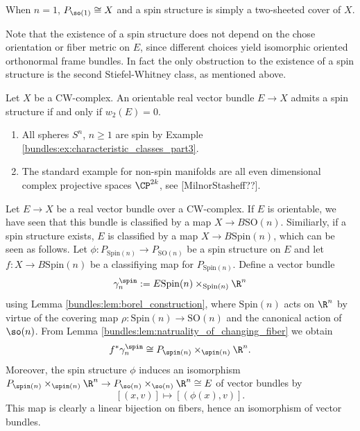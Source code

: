 \begin{remark}
    When $n=1$, $P_{\so(1)} \cong X$ and a spin structure is simply a two-sheeted cover of $X$.
\end{remark}
Note that the existence of a spin structure does not depend on the chose orientation or fiber metric on $E$, since different choices yield isomorphic oriented orthonormal frame bundles. In fact the only obstruction to the existence of a spin structure is the second Stiefel-Whitney class, as mentioned above.

\begin{theorem}[Lawson,Micheaslon] %
    \label{bundles:thm:spin_iff_w2_vanishes}
    Let $X$ be a CW-complex. An orientable real vector bundle $E \to X$ admits a spin structure if and only if $w_2(E) = 0$. 
\end{theorem}

\begin{example}
    \begin{enumerate}[label=(\roman*)]
        \item All spheres $S^n$, $n\geq 1$ are spin by Example \label{bundles:ex:characteristic_classes} \ref{bundles:ex:characteristic_classes_part3}.
        \item \label{bundles:ex:cp2_not_spin} The standard example for non-spin manifolds are all even dimensional complex projective spaces $\CP^{2k}$, see [MilnorStasheff??].
    \end{enumerate}
\end{example}

\begin{remark}
    \label{bundles:rem:classifying_map_for_spin_bundles}
    Let $E \to X$ be a real vector bundle over a CW-complex. If $E$ is orientable, we have seen that this bundle is classified by a map $X \to B\mathrm{SO}(n)$. Similiarly, if a spin structure exists, $E$ is classified by a map $X \to B\mathrm{Spin}(n)$, which can be seen as follows. Let $\phi \colon P_{\mathrm{Spin}(n)} \to P_{\mathrm{SO}(n)}$ be a spin structure on $E$ and let $f \colon X \to B\mathrm{Spin}(n)$ be a classifiying map for $P_{\mathrm{Spin}(n)}$. Define a vector bundle 
    \[
    \gamma_n^\spin := E\mathrm{Spin}(n) \times_{\mathrm{Spin}(n)} \R^n
    \]
    using Lemma \ref{bundles:lem:borel_construction}, where $\mathrm{Spin}(n)$ acts on $\R^n$ by virtue of the covering map $\rho \colon \mathrm{Spin}(n) \to \mathrm{SO}(n)$ and the canonical action of $\so(n)$. From Lemma \ref{bundles:lem:natruality_of_changing_fiber} we obtain
    \[
    f^\ast \gamma_n^\spin \cong P_{\spin(n)} \times_{\spin(n)} \R^n.
    \]
    Moreover, the spin structure $\phi$ induces an isomorphism $P_{\spin(n)} \times_{\spin(n)} \R^n \to P_{\so(n)} \times_{\so(n)} \R^n \cong E$ of vector bundles by
    \[
    [(x,v)] \mapsto [(\phi(x),v)].
    \]
    This map is clearly a linear bijection on fibers, hence an isomorphism of vector bundles. 
\end{remark}

